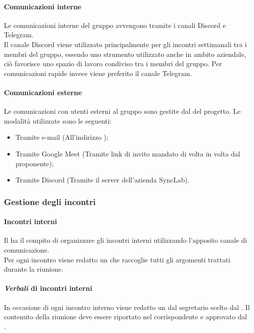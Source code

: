 \paragraph{Comunicazioni interne}
Le comunicazioni interne del gruppo \groupName{} avvengono tramite i canali Discord\glo{} e Telegram\glo{}.\\
Il canale Discord\glo{} viene utilizzato principalmente per gli incontri settimanali tra i membri del gruppo, essendo uno strumento utilizzato anche in ambito aziendale, ciò favorisce uno spazio di lavoro condiviso tra i membri del gruppo.
Per comunicazioni rapide invece viene preferito il canale Telegram\glo{}.

\paragraph{Comunicazioni esterne}
Le comunicazioni con utenti esterni al gruppo sono gestite dal \roleProjectManagerLow{} del progetto. Le modalità utilizzate sono le seguenti:
\begin {itemize}
\item Tramite e-mail (All'indirizzo \groupEmail{});
\item Tramite Google Meet\glo{} (Tramite link di invito mandato di volta in volta dal proponente);
\item Tramite Discord\glo{} (Tramite il server dell'azienda SyncLab).
\end {itemize}

\subsubsection{Gestione degli incontri}
\paragraph{Incontri interni}
Il \roleProjectManagerLow{} ha il compito di organizzare gli incontri interni utilizzando l'apposito canale di comunicazione.\\
Per ogni incontro viene redatto un \docNameVLow{} che raccoglie tutti gli argomenti trattati durante la riunione.
\paragraph {\textit{Verbali} di incontri interni}
In occasione di ogni incontro interno viene redatto un \docNameVLow{} dal segretario scelto dal \roleProjectManagerLow{}. Il contenuto della riunione deve essere riportato nel \docNameVLow{} corrispondente e approvato dal \roleProjectManagerLow{}.

